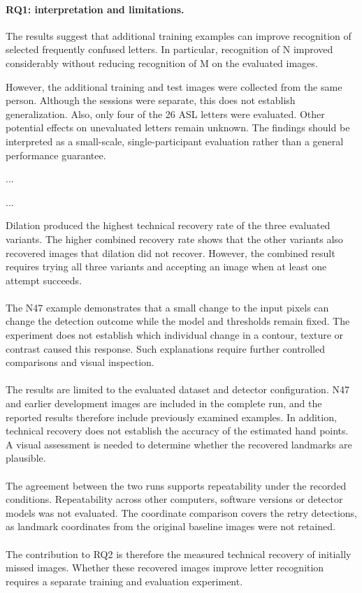 \documentclass{article}
\begin{document}
\fi
\paragraph{RQ1: interpretation and limitations.}
The results suggest that additional training examples can improve recognition of selected frequently confused letters. In particular, recognition of N improved considerably without reducing recognition of M on the evaluated images. 

However, the additional training and test images were collected from the same person. Although the sessions were separate, this does not establish generalization. Also, only four of the 26 ASL letters were evaluated. Other potential effects on unevaluated letters remain unknown. The findings should be interpreted as a small-scale, single-participant evaluation rather than a general performance guarantee.
\par\noindent ...\par\medskip


\par\noindent ...\par\medskip
        Dilation produced the highest technical recovery rate of the three evaluated variants. The higher combined recovery rate shows that the other variants also recovered images that dilation did not recover. However, the combined result requires trying all three variants and accepting an image when at least one attempt succeeds.
        \\\\
        The N47 example demonstrates that a small change to the input pixels can change the detection outcome while the model and thresholds remain fixed. The experiment does not establish which individual change in a contour, texture or contrast caused this response. Such explanations require further controlled comparisons and visual inspection.
        \\\\
        The results are limited to the evaluated dataset and detector configuration. N47 and earlier development images are included in the complete run, and the reported results therefore include previously examined examples. In addition, technical recovery does not establish the accuracy of the estimated hand points. A visual assessment is needed to determine whether the recovered landmarks are plausible.
        \\\\
        The agreement between the two runs supports repeatability under the recorded conditions. Repeatability across other computers, software versions or detector models was not evaluated. The coordinate comparison covers the retry detections, as landmark coordinates from the original baseline images were not retained.
        \\\\
        The contribution to RQ2 is therefore the measured technical recovery of initially missed images. Whether these recovered images improve letter recognition requires a separate training and evaluation experiment.
        
\end{document}
